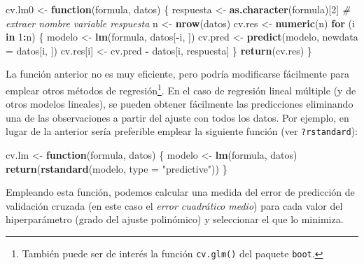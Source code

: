 \documentclass[
  spanish,
]{book}
\newenvironment{Shaded}{\begin{snugshade}}{\end{snugshade}}
\newcommand{\CommentTok}[1]{\textcolor[rgb]{0.56,0.35,0.01}{\textit{#1}}}
\newcommand{\ControlFlowTok}[1]{\textcolor[rgb]{0.13,0.29,0.53}{\textbf{#1}}}
\newcommand{\DataTypeTok}[1]{\textcolor[rgb]{0.13,0.29,0.53}{#1}}
\newcommand{\DecValTok}[1]{\textcolor[rgb]{0.00,0.00,0.81}{#1}}
\newcommand{\KeywordTok}[1]{\textcolor[rgb]{0.13,0.29,0.53}{\textbf{#1}}}
\newcommand{\NormalTok}[1]{#1}
\newcommand{\OperatorTok}[1]{\textcolor[rgb]{0.81,0.36,0.00}{\textbf{#1}}}
\newcommand{\StringTok}[1]{\textcolor[rgb]{0.31,0.60,0.02}{#1}}
\theoremstyle{break}
\theoremstyle{definition}
\theoremstyle{definition}
\theoremstyle{definition}
\theoremstyle{remark}
\begin{document}
\begin{Shaded}
\begin{Highlighting}[]
\NormalTok{cv.lm0 <-}\StringTok{ }\ControlFlowTok{function}\NormalTok{(formula, datos) \{}
\NormalTok{    respuesta <-}\StringTok{ }\KeywordTok{as.character}\NormalTok{(formula)[}\DecValTok{2}\NormalTok{] }\CommentTok{# extraer nombre variable respuesta}
\NormalTok{    n <-}\StringTok{ }\KeywordTok{nrow}\NormalTok{(datos)}
\NormalTok{    cv.res <-}\StringTok{ }\KeywordTok{numeric}\NormalTok{(n)}
    \ControlFlowTok{for}\NormalTok{ (i }\ControlFlowTok{in} \DecValTok{1}\OperatorTok{:}\NormalTok{n) \{}
\NormalTok{        modelo <-}\StringTok{ }\KeywordTok{lm}\NormalTok{(formula, datos[}\OperatorTok{-}\NormalTok{i, ])}
\NormalTok{        cv.pred <-}\StringTok{ }\KeywordTok{predict}\NormalTok{(modelo, }\DataTypeTok{newdata =}\NormalTok{ datos[i, ])}
\NormalTok{        cv.res[i] <-}\StringTok{ }\NormalTok{cv.pred }\OperatorTok{-}\StringTok{ }\NormalTok{datos[i, respuesta]}
\NormalTok{    \}}
    \KeywordTok{return}\NormalTok{(cv.res)}
\NormalTok{\}}
\end{Highlighting}
\end{Shaded}

La función anterior no es muy eficiente, pero podría modificarse fácilmente para emplear otros métodos de regresión\footnote{También puede ser de interés la función \texttt{cv.glm()} del paquete \texttt{boot}.}.
En el caso de regresión lineal múltiple (y de otros modelos lineales), se pueden obtener fácilmente las predicciones eliminando una de las observaciones a partir del ajuste con todos los datos.
Por ejemplo, en lugar de la anterior sería preferible emplear la siguiente función (ver \texttt{?rstandard}):

\begin{Shaded}
\begin{Highlighting}[]
\NormalTok{cv.lm <-}\StringTok{ }\ControlFlowTok{function}\NormalTok{(formula, datos) \{}
\NormalTok{    modelo <-}\StringTok{ }\KeywordTok{lm}\NormalTok{(formula, datos)}
    \KeywordTok{return}\NormalTok{(}\KeywordTok{rstandard}\NormalTok{(modelo, }\DataTypeTok{type =} \StringTok{"predictive"}\NormalTok{))}
\NormalTok{\}}
\end{Highlighting}
\end{Shaded}

Empleando esta función, podemos calcular una medida del error de predicción de validación cruzada (en este caso el \emph{error cuadrático medio}) para cada valor del hiperparámetro (grado del ajuste polinómico) y seleccionar el que lo minimiza.
\end{document}
